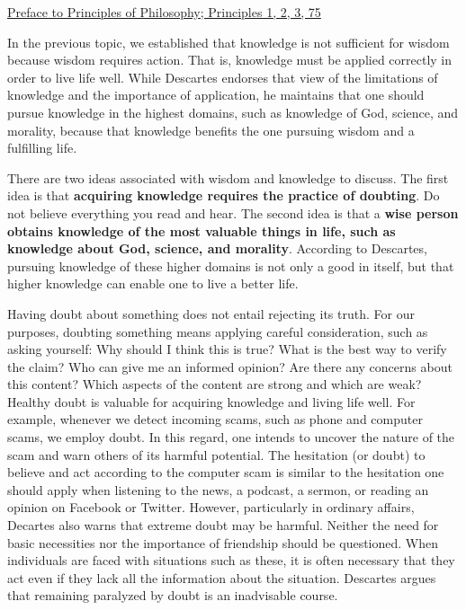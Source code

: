 \documentclass[
]{book}
\begin{document}
\begin{reflect}
\href{assets/u1/PrinciplesofPhilosophy.pdf}{Preface to Principles of Philosophy; Principles 1, 2, 3, 75}
\end{reflect}

In the previous topic, we established that knowledge is not sufficient for wisdom because wisdom requires action. That is, knowledge must be applied correctly in order to live life well. While Descartes endorses that view of the limitations of knowledge and the importance of application, he maintains that one should pursue knowledge in the highest domains, such as knowledge of God, science, and morality, because that knowledge benefits the one pursuing wisdom and a fulfilling life.

There are two ideas associated with wisdom and knowledge to discuss. The first idea is that \textbf{acquiring knowledge requires the practice of doubting}. Do not believe everything you read and hear. The second idea is that a \textbf{wise person obtains knowledge of the most valuable things in life, such as knowledge about God, science, and morality}. According to Descartes, pursuing knowledge of these higher domains is not only a good in itself, but that higher knowledge can enable one to live a better life.

Having doubt about something does not entail rejecting its truth. For our purposes, doubting something means applying careful consideration, such as asking yourself: Why should I think this is true? What is the best way to verify the claim? Who can give me an informed opinion? Are there any concerns about this content? Which aspects of the content are strong and which are weak? Healthy doubt is valuable for acquiring knowledge and living life well. For example, whenever we detect incoming scams, such as phone and computer scams, we employ doubt. In this regard, one intends to uncover the nature of the scam and warn others of its harmful potential. The hesitation (or doubt) to believe and act according to the computer scam is similar to the hesitation one should apply when listening to the news, a podcast, a sermon, or reading an opinion on Facebook or Twitter. However, particularly in ordinary affairs, Decartes also warns that extreme doubt may be harmful. Neither the need for basic necessities nor the importance of friendship should be questioned. When individuals are faced with situations such as these, it is often necessary that they act even if they lack all the information about the situation. Descartes argues that remaining paralyzed by doubt is an inadvisable course.
\end{document}
